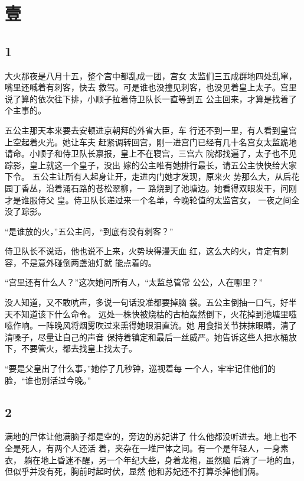 \section{壹}

{\centering\subsection{1}}

大火那夜是八月十五，整个宫中都乱成一团，宫女
太监们三五成群地四处乱窜，嘴里还喊着有刺客，快去
救驾。可是谁也没撞见刺客，也没见着皇上太子。宫里
说了算的依次往下排，小顺子拉着侍卫队长一直等到五
公主回来，才算是找着了个主事的。

五公主那天本来要去安顿进京朝拜的外省大臣，车
行还不到一里，有人看到皇宫上空起着火光。她让车夫
赶紧调转回宫，刚一进宫门已经有几十名宫女太监跪地
请命。小顺子和侍卫队长禀报，皇上不在寝宫，三宫六
院都找遍了，太子也不见踪影，皇上就这一个皇子，没出
嫁的公主唯有她排行最长，请五公主快快给大家下令。
五公主让所有人起身让开，走进内门她才发现，原来火
势那么大，从后花园丁香丛，沿着涌石路的苍松翠柳，一
路烧到了池塘边。她看得双眼发干，问刚才是谁服侍父
皇。侍卫队长递过来一个名单，今晚轮值的太监宫女，
一夜之间全没了踪影。

“是谁放的火，”五公主问，“到底有没有刺客？”

侍卫队长不说话，他也说不上来，火势映得漫天血
红，这么大的火，肯定有刺容，不是意外碰倒两盏油灯就
能点着的。

“宫里还有什么人？”这次她问所有人，“太监总管常
公公，人在哪里？”

没人知道，又不敢吭声，多说一句话没准都要掉脑
袋。五公主倒抽一口气，好半天不知道该下什么命令。
远处一株快被烧枯的古柏轰然倒下，火花掉到池塘里嗞
嗞作响。一阵晚风将烟雾吹过来熏得她眼泪直流。她
用食指关节抹抹眼睛，清了清嗓子，尽量让自己的声音
保持着镇定和最后一丝威严。她告诉这些人把水桶放
下，不要管火，都去找皇上找太子。

“要是父皇出了什么事，”她停了几秒钟，巡视着每
一个人，牢牢记住他们的脸，“谁也别活过今晚。”
\newline

{\centering\subsection{2}}

满地的尸体让他满脑子都是空的，旁边的苏妃讲了
什么他都没听进去。地上也不全是死人，有两个人还活
着，夹杂在一堆尸体之间。有一个是年轻人，一身素衣，
躺在地上昏迷不醒，另一个年纪大些，身着龙袍，虽然脑
后淌了一地的血，但似乎并没有死，胸前时起时伏，显然
他和苏妃还不打算杀掉他们俩。

